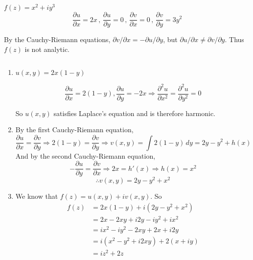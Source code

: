\documentclass{article}
\theoremstyle{definition}
\begin{document}
	\begin{prob}{3.48} $ $ \vspace{2mm} \\
		$ f(z) = x^2 + iy^3 $
		$$ \dfrac{\partial u}{\partial x} = 2x \, , \, \dfrac{\partial u}{\partial y} = 0 \, , \, \dfrac{\partial v}{\partial x} = 0 \, , \, \dfrac{\partial v}{\partial y} = 3y^2 $$
		
		By the Cauchy-Riemann equations, $ \partial v / \partial x = - \partial u / \partial y $, but $ \partial u / \partial x \neq  \partial v / \partial y $. Thus $ f(z) $ is not analytic.
	\end{prob}

	\begin{prob}{3.50} $  $
		\begin{enumerate}[label=\alph*.)]
			\item $ u(x,y) = 2x(1-y) $ 
			
			$$ \dfrac{\partial u}{\partial x} = 2(1-y), \dfrac{\partial u}{\partial y} = -2x \Rightarrow \dfrac{\partial^2 u}{\partial x^2} = \dfrac{\partial^2 u}{\partial y^2} = 0 $$ 
			
			So $ u(x,y) $ satisfies Laplace's equation and is therefore harmonic.
			
			\item By the first Cauchy-Riemann equation,
			\[
				\frac{\partial u}{\partial x} = \frac{\partial v}{\partial y} \Rightarrow 2(1-y) = \frac{\partial v}{\partial y} \Rightarrow v(x,y) = \int 2(1-y) \,dy = 2y - y^2 + h(x)
			\]
			And by the second Cauchy-Riemann equation,
			\[
				-\frac{\partial u}{\partial y} = \frac{\partial v}{\partial x} \Rightarrow 2x = h'(x) \Rightarrow h(x) = x^2
			\]
			\[
				 \therefore \boxed{v(x,y) = 2y-y^2+x^2}
			\]
			
			\item We know that $ f(z) = u(x,y) + iv(x,y) $. So
				\begin{align*}
						 f(z) &= 2x(1-y) + i(2y - y^2 + x^2) \\
						 &= 2x - 2xy + i2y - iy^2 + ix^2 \\
						 &= ix^2 - iy^2 - 2xy + 2x + i2y \\
						 &= i(x^2-y^2 + i2xy) + 2(x+iy) \\
						 &= \boxed{iz^2 + 2z} 
				\end{align*}
		\end{enumerate}
	\end{prob}




















    
    
\end{document}
